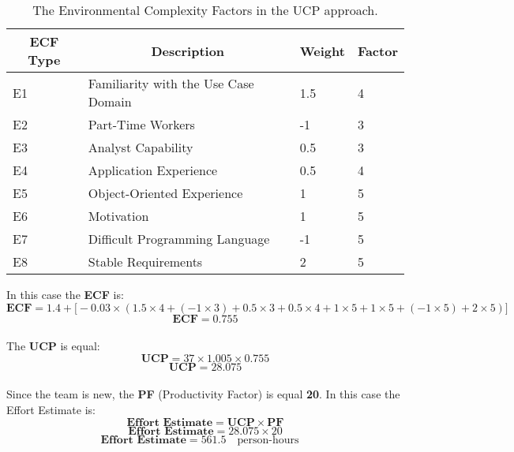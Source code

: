 \documentclass[12pt]{article}
\begin{document}
\begin{table}[h]
\centering
\begin{tabular}{|l|l|l|l|}
\hline
\multicolumn{1}{|c|}{\textbf{ECF Type}} & \multicolumn{1}{c|}{\textbf{Description}} & \multicolumn{1}{c|}{\textbf{Weight}} & \multicolumn{1}{c|}{\textbf{Factor}} \\ \hline
E1 & Familiarity with the Use Case Domain & 1.5 & 4 \\ \hline
E2 & Part-Time Workers & -1 & 3 \\ \hline
E3 & Analyst Capability & 0.5 & 3 \\ \hline
E4 & Application Experience & 0.5 & 4 \\ \hline
E5 & Object-Oriented Experience & 1 & 5 \\ \hline
E6 & Motivation & 1 & 5 \\ \hline
E7 & Difficult Programming Language & -1 & 5 \\ \hline
E8 & Stable Requirements & 2 & 5 \\ \hline
\end{tabular}
\caption{The Environmental Complexity Factors in the UCP approach.}
\end{table}

In this case the \textbf{ECF} is:
\begin{equation}
    \textbf{ECF} =  1.4 + \Big[-0.03 \times(1.5\times4+(-1\times3)+0.5\times3+0.5\times4+1\times5+1\times5+(-1\times5)+2\times5)\Big]
\end{equation}
\begin{equation}
    \textbf{ECF} =  0.755
\end{equation}\\

The \textbf{UCP} is equal:
\begin{equation}
    \textbf{UCP} = 37 \times 1.005 \times 0.755
\end{equation}
\begin{equation}
    \textbf{UCP} = 28.075
\end{equation}\\

Since the team is new, the \textbf{PF} (Productivity Factor) is equal \textbf{20}.
In this case the Effort Estimate is:
\begin{equation}
    \textbf{Effort Estimate} = \textbf{UCP} \times \textbf{PF}
\end{equation}
\begin{equation}
    \textbf{Effort Estimate} = 28.075 \times 20
\end{equation}
\begin{equation}
    \textbf{Effort Estimate} = 561.5 \quad \textrm{person-hours} \quad
\end{equation}\\
\end{document}
